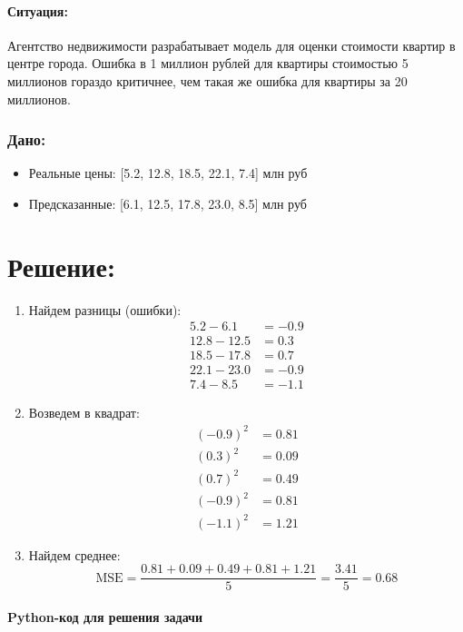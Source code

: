 \documentclass[12pt]{article}
\theoremstyle{definition}
\theoremstyle{definition}
\theoremstyle{definition}
\theoremstyle{remark}
\theoremstyle{remark}
\begin{document}
\paragraph{Ситуация:} Агентство недвижимости разрабатывает модель для оценки стоимости квартир в центре города. Ошибка в 1 миллион рублей для квартиры стоимостью 5 миллионов гораздо критичнее, чем такая же ошибка для квартиры за 20 миллионов.

\subsubsection*{Дано:}
\begin{itemize}
    \item Реальные цены: [5.2, 12.8, 18.5, 22.1, 7.4] млн руб
    \item Предсказанные: [6.1, 12.5, 17.8, 23.0, 8.5] млн руб
\end{itemize}


\section*{Решение:}

\begin{enumerate}
    \item {Найдем разницы (ошибки):}
    \[
    \begin{aligned}
    5.2 - 6.1 &= -0.9 \\
    12.8 - 12.5 &= 0.3 \\
    18.5 - 17.8 &= 0.7 \\
    22.1 - 23.0 &= -0.9 \\
    7.4 - 8.5 &= -1.1
    \end{aligned}
    \]

    \item {Возведем в квадрат:}
    \[
    \begin{aligned}
    (-0.9)^2 &= 0.81 \\
    (0.3)^2 &= 0.09 \\
    (0.7)^2 &= 0.49 \\
    (-0.9)^2 &= 0.81 \\
    (-1.1)^2 &= 1.21
    \end{aligned}
    \]

    \item {Найдем среднее:}
    \[
    \text{MSE} = \frac{0.81 + 0.09 + 0.49 + 0.81 + 1.21}{5} = \frac{3.41}{5} = 0.68
    \]
\end{enumerate}

\paragraph*{Python-код для решения задачи}
\end{document}
